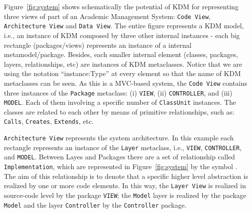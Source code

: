 Figure~\ref{fig:system} shows schematically the potential of KDM for representing three views of part of an Academic Management System: \texttt{Code View}, \texttt{Architecture View} and \texttt{Data View}. The entire figure represents a KDM model, i.e., an instance of KDM composed by three other internal instances - each big rectangle (packages/views) represents an instance of a internal metamodel/package. Besides, each smaller internal element (classes, packages, layers, relationships, etc) are instances of KDM metaclasses. Notice that we are using the notation ``instance:Type'' at every element so that the name of KDM metaclasses can be seen.
As this is a MVC-based system, the \texttt{Code View} contains three instances of the \texttt{Package} metaclass: (i) \texttt{VIEW}, (ii) \texttt{CONTROLLER}, and (iii) \texttt{MODEL}. Each of them involving a specific number of \texttt{ClassUnit} instances. The classes are related to each other by means of primitive relationships, such as: \texttt{Calls}, \texttt{Creates}, \texttt{Extends}, etc.

\texttt{Architecture View} represents the system architecture. In this example each rectangle represents an instance of the \texttt{Layer} metaclass, i.e., \texttt{VIEW}, \texttt{CONTROLLER}, and \texttt{MODEL}. Between Layes and Packages there are a set of relationship called \texttt{Implementation}, which are represented in Figure~\ref{fig:system} by the symbol \foobarMeu. The aim of this relationship is to denote that a specific higher level abstraction is realized by one or more code elements. In this way, the \texttt{Layer View} is realized in source-code level by the package \texttt{VIEW}; the \texttt{Model} layer is realized by the package \texttt{Model} and the layer \texttt{Controller} by the \texttt{Controller} package.


